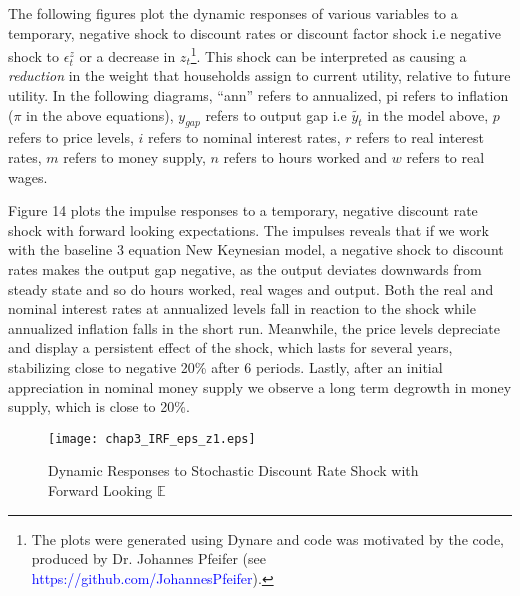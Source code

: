 \documentclass[12pt]{article}
\newcommand{\1}{\mathbbm 1}
\begin{document}
The following figures plot the dynamic responses of various variables to a temporary, negative shock to discount rates or discount factor shock i.e negative shock to $\epsilon_{t}^{z}$ or a decrease in $z_{t}$\footnote{The plots were generated using Dynare and code was motivated by the code, produced by Dr. Johannes Pfeifer (see \textcolor{blue}{https://github.com/JohannesPfeifer}).}. This shock can be interpreted as causing a \textit{reduction} in the weight that households assign to current utility, relative to future utility. In the following diagrams, ``ann'' refers to annualized, pi refers to inflation ($\pi$ in the above equations), $y_{gap}$ refers to output gap i.e $\widetilde{y_{t}}$ in the model above, $p$ refers to price levels, $i$ refers to nominal interest rates, $r$ refers to real interest rates, $m$ refers to money supply, $n$ refers to hours worked and $w$ refers to real wages.

Figure 14 plots the impulse responses to a temporary, negative discount rate shock with forward looking expectations. The impulses reveals that if we work with the baseline 3 equation New Keynesian model, a negative shock to discount rates makes the output gap negative, as the output deviates downwards from steady state and so do hours worked, real wages and output. Both the real and nominal interest rates at annualized levels fall in reaction to the shock while annualized inflation falls in the short run. Meanwhile, the price levels depreciate and display a persistent effect of the shock, which lasts for several years, stabilizing close to negative 20\% after 6 periods. Lastly, after an initial appreciation in nominal money supply we observe a long term degrowth in money supply, which is close to 20\%.








	

	
	
	\begin{figure}[H]
		\begin{center}
			\texttt{[image: chap3\_IRF\_eps\_z1.eps]}
		\end{center}
		\caption{Dynamic Responses to Stochastic Discount Rate Shock with Forward Looking $\mathbb{E}$}
	\end{figure}
\end{document}
